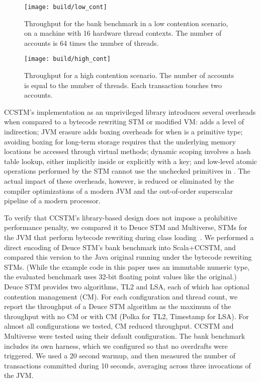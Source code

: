 
\begin{figure}
  \centering \texttt{[image: build/low\_cont]}

\caption{Throughput for the bank benchmark in a low contention scenario,
on a machine with 16 hardware thread contexts.  The number of accounts
is 64 times the number of threads.}

  \label{fig:lowcont}
\end{figure}

\begin{figure}
  \centering \texttt{[image: build/high\_cont]}

\caption{Throughput for a high contention scenario.  The number of accounts is
equal to the number of threads.  Each transaction touches two accounts.}

  \label{fig:highcont}
\end{figure}

CCSTM's implementation as an unprivileged library introduces several
overheads when compared to a bytecode rewriting STM or modified VM:
 adds a level of indirection; JVM erasure adds boxing overheads
for  when  is a primitive type; avoiding boxing
for long-term storage requires that the underlying memory locations
be accessed through virtual methods; dynamic scoping involves a hash
table lookup, either implicitly inside  or explicitly
with a  key; and low-level atomic operations performed by
the STM cannot use the unchecked primitives in .
The actual impact of these overheads, however, is reduced or eliminated
by the compiler optimizations of a modern JVM and the out-of-order
superscalar pipeline of a modern processor.

To verify that CCSTM's library-based design does not impose a prohibitive
performance penalty, we compared it to Deuce STM and Multiverse, STMs for
the JVM that perform bytecode rewriting during class
loading~\cite{deucestm,multiverse}.
We performed a direct encoding of Deuce STM's bank benchmark into
Scala+CCSTM, and compared this version to the Java original running
under the bytecode rewriting STMs.  (While the example code in this paper uses an
immutable  numeric type, the evaluated benchmark uses 32-bit
floating point values like the original.)  Deuce STM provides two algorithms,
TL2 and LSA, each of which has optional contention management (CM).
For each configuration and thread count, we report the throughput of a Deuce STM algorithm
as the maximum of the throughput with no CM or with CM (Polka for TL2, Timestamp for
LSA).
For almost all configurations we tested, CM reduced
throughput.  CCSTM and Multiverse were tested using their default
configuration.
The bank benchmark includes its own harness, which we configured so
that no overdrafts were triggered.  We used a 20 second warmup, and
then measured the number of transactions committed during 10 seconds,
averaging across three invocations of the JVM.

